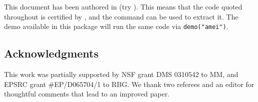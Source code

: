 \documentclass[shortnames,nojss]{jss}
\begin{document}
This document has been authored in  (try
).  This means that the code quoted throughout is
certified by , and the  command can be used
to extract it.  The demo available in this package will run the same
code via \verb!demo("amei")!.


\subsection*{Acknowledgments}
This work was partially supported by NSF grant DMS 0310542 to MM, and
EPSRC grant \#EP/D065704/1 to RBG.  We thank two referees and 
an editor for thoughtful comments that lead to an improved paper.



%
\end{document}
